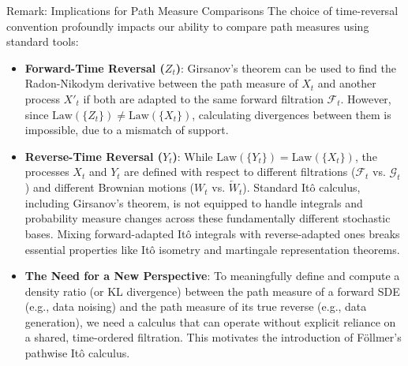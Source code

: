 \begin{lightgraybox}{Remark: Implications for Path Measure Comparisons}
    The choice of time-reversal convention profoundly impacts our ability to compare path measures using standard tools:
    \begin{itemize}
        \item \textbf{Forward-Time Reversal ($Z_t$)}: Girsanov's theorem can be used to find the Radon-Nikodym derivative between the path measure of $X_t$ and another process $X'_t$ if both are adapted to the same forward filtration $\mathcal{F}_t$. However, since $\text{Law}(\{Z_t\}) \neq \text{Law}(\{X_t\})$, calculating divergences between them is impossible, due to a mismatch of support.
        \item \textbf{Reverse-Time Reversal ($Y_t$)}: While $\text{Law}(\{Y_t\}) = \text{Law}(\{X_t\})$, the processes $X_t$ and $Y_t$ are defined with respect to different filtrations ($\mathcal{F}_t$ vs. $\mathcal{G}_t$) and different Brownian motions ($W_t$ vs. $\overleftarrow{W}_t$). Standard Itô calculus, including Girsanov's theorem, is not equipped to handle integrals and probability measure changes across these fundamentally different stochastic bases. Mixing forward-adapted Itô integrals with reverse-adapted ones breaks essential properties like Itô isometry and martingale representation theorems.
        \item \textbf{The Need for a New Perspective}: To meaningfully define and compute a density ratio (or KL divergence) between the path measure of a forward SDE (e.g., data noising) and the path measure of its true reverse (e.g., data generation), we need a calculus that can operate without explicit reliance on a shared, time-ordered filtration. This motivates the introduction of Föllmer's pathwise Itô calculus.
    \end{itemize}
\end{lightgraybox}



